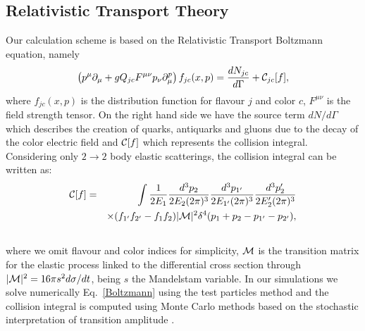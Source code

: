 \documentclass[aps,prc,a4paper,nofootinbib,
preprintnumbers,superscriptaddress,twocolumn,showpacs,showkeys]{revtex4}
\begin{document}
\subsection{Relativistic Transport Theory}

Our calculation scheme is based on the Relativistic Transport Boltzmann equation, namely
\begin{equation}
\label{Boltzmann}
\left( p^{\mu}\partial_{\mu} + 
g Q_{jc} F^{\mu\nu}p_{\nu}\partial_{\mu}^{p} \right)f_{jc}(x,p)=\frac{dN_{jc}}{d\Gamma}+{\cal C}_{jc}[f],
\end{equation}
where $f_{jc}(x,p)$ is the distribution function for flavour $j$ and color $c$, $F^{\mu\nu}$ is the field strength tensor. 
On the right hand side we have the source term $dN/d\Gamma$ which describes the creation of quarks, antiquarks and gluons due to the decay of the color electric field and ${\cal C}[f]$ which represents the collision integral.
Considering only $2\to 2$ body elastic scatterings, the collision integral can be written as:
\begin{eqnarray}
{\cal C}[f]&=& 
 \int\frac{1}{2E_1 }
 \frac{d^3p_2}{2E_2(2\pi)^3}  \frac{d^3p_{1^\prime}}{2E_{1^\prime}(2\pi)^3}  
 \frac{d^3p_2^\prime}{2E_2^\prime(2\pi)^3}\nonumber\\
&&\times(f_{1^\prime}f_{2^\prime} - f_1 f_2) |{\cal M}|^2\delta^4(p_1 + p_2 - p_{1^\prime} - p_{2^\prime}),\nonumber\\
&&
\end{eqnarray}
where we omit flavour and color indices for simplicity,  
${\cal M}$ is the transition matrix for the elastic process linked to the differential cross section 
through $|{\cal M}|^2=16\pi s^2d\sigma/dt$, being $s$ the Mandelstam variable.
In our simulations we solve numerically Eq.~\eqref{Boltzmann} 
using the test particles method and the collision integral is computed 
using Monte Carlo methods based on the stochastic interpretation 
of transition amplitude \cite{Xu:2008av,Xu:2007jv,Bratkovskaya:2011wp,Ferini:2008he,
Plumari_BARI,Plumari:2012xz,Ruggieri:2013bda,Ruggieri:2013ova,Plumari:2012ep}.
\end{document}
